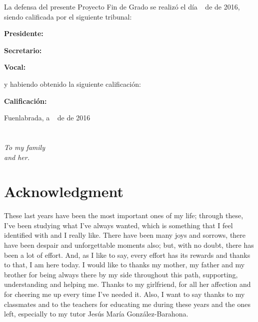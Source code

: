 \documentclass[a4paper, 12pt]{book}
\begin{document}
\vspace{1cm}
La defensa del presente Proyecto Fin de Grado se realizó el día \qquad$\;\,$ de \qquad\qquad\qquad\qquad \newline de 2016, siendo calificada por el siguiente tribunal:


\vspace{0.5cm}
\textbf{Presidente:}

\vspace{1.2cm}
\textbf{Secretario:}

\vspace{1.2cm}
\textbf{Vocal:}


\vspace{1.2cm}
y habiendo obtenido la siguiente calificación:

\vspace{1cm}
\textbf{Calificación:}


\vspace{1cm}
\begin{flushright}
Fuenlabrada, a \qquad$\;\,$ de \qquad\qquad\qquad\qquad de 2016
\end{flushright}


\chapter*{}
\begin{flushright}
\textit{To my family \\ and her.
}
\end{flushright}


\chapter*{Acknowledgment}

These last years have been the most important ones of my life; through these, I’ve been studying what I’ve always wanted, which is something that I feel identified with and I really like. There have been many joys and sorrows, there have been despair and unforgettable moments also; but, with no doubt, there has been a lot of effort. And, as I like to say, every effort has its rewards and thanks to that, I am here today. I would like to thanks my mother, my father and my brother for being always there by my side throughout this path, supporting, understanding and helping me. Thanks to my girlfriend, for all her affection and for cheering me up every time I’ve needed it. Also, I want to say thanks to my classmates and to the teachers for educating me during these years and the ones left, especially to my tutor Jesús María González-Barahona. \\
\end{document}
